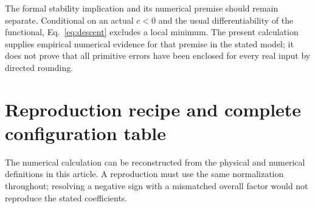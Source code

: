 The formal stability implication and its numerical premise should remain separate. Conditional on an actual $c<0$ and the usual differentiability of the functional, Eq.~\eqref{eq:descent} excludes a local minimum. The present calculation supplies empirical numerical evidence for that premise in the stated model; it does not prove that all primitive errors have been enclosed for every real input by directed rounding.

\section{Reproduction recipe and complete configuration table}\label{app:repro}
The numerical calculation can be reconstructed from the physical and numerical definitions in this article. A reproduction must use the same normalization throughout; resolving a negative sign with a mismatched overall factor would not reproduce the stated coefficients.

